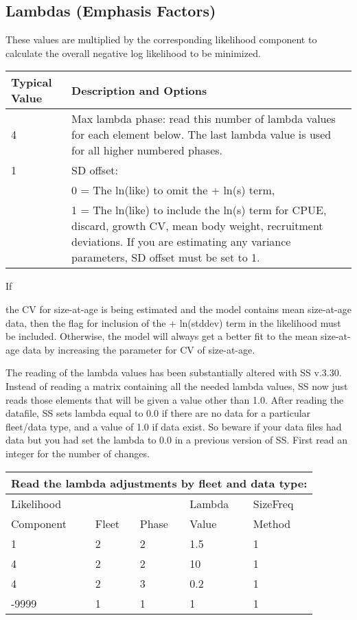 \hypertarget{Lambdas}{}
\subsection{Lambdas (Emphasis Factors)}
These values are multiplied by the corresponding likelihood component to calculate the overall negative log likelihood to be minimized.


\begin{tabular}{p{3cm} p{13cm}}
	\hline
	Typical Value & Description and Options\Tstrut\Bstrut\\
	\hline
	4 \Tstrut & Max lambda phase: read this number of lambda values for each element below.  The last lambda value is used for all higher numbered phases.\Bstrut\\
	1 & SD offset: \\
	  & 0 = The ln(like) to omit the + ln(s) term,\\
	  & 1 = The ln(like) to include the ln(s) term for CPUE, discard, growth CV, mean body weight, recruitment deviations. If you are estimating any variance parameters, SD offset must be set to 1.  \Bstrut\\
	\hline
\end{tabular}

\pagebreak

\hypertarget{SaAlambda}{If} the CV for size-at-age is being estimated and the model contains mean size-at-age data, then the flag for inclusion of the + ln(stddev) term in the likelihood must be included. Otherwise, the model will always get a better fit to the mean size-at-age data by increasing the parameter for CV of size-at-age.

The reading of the lambda values has been substantially altered with SS v.3.30. Instead of reading a matrix containing all the needed lambda values, SS now just reads those elements that will be given a value other than 1.0.  After reading the datafile, SS sets lambda equal to 0.0 if there are no data for a particular fleet/data type, and a value of 1.0 if data exist. So beware if your data files had data but you had set the lambda to 0.0 in a previous version of SS.  First read an integer for the number of changes.


\begin{longtable}{p{3cm} p{3cm} p{2cm} p{3cm} p{3cm}}

	\multicolumn{5}{l}{Read the lambda adjustments by fleet and data type:}\\
	\hline
	Likelihood &       &       & Lambda & SizeFreq\Tstrut\\
	Component  & Fleet & Phase & Value  & Method \Bstrut\\
	\hline
	1 & 2 & 2 & 1.5 & 1 \Tstrut\\
	4 & 2 & 2 & 10 & 1 \\
	4 & 2 & 3 & 0.2 & 1 \\
	-9999 & 1 & 1 & 1 & 1 \Bstrut\\
	\hline
\end{longtable}


